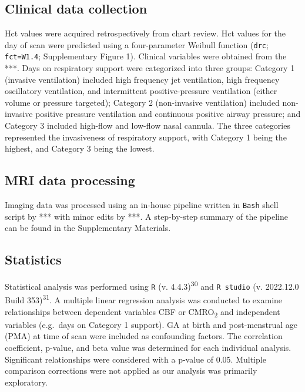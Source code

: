 \documentclass[
  letterpaper,
  DIV=11,
  numbers=noendperiod]{scrartcl}
\begin{document}
\subsection{Clinical data collection}\label{clinical-data-collection}

Hct values were acquired retrospectively from chart review. Hct values
for the day of scan were predicted using a four-parameter Weibull
function (\texttt{drc}; \texttt{fct=W1.4}; Supplementary Figure 1).
Clinical variables were obtained from the ***. Days on respiratory
support were categorized into three groups: Category 1 (invasive
ventilation) included high frequency jet ventilation, high frequency
oscillatory ventilation, and intermittent positive-pressure ventilation
(either volume or pressure targeted); Category 2 (non-invasive
ventilation) included non-invasive positive pressure ventilation and
continuous positive airway pressure; and Category 3 included high-flow
and low-flow nasal cannula. The three categories represented the
invasiveness of respiratory support, with Category 1 being the highest,
and Category 3 being the lowest.

\subsection{MRI data processing}\label{mri-data-processing}

Imaging data was processed using an in-house pipeline written in
\texttt{Bash} shell script by *** with minor edits by ***. A
step-by-step summary of the pipeline can be found in the Supplementary
Materials.

\subsection{Statistics}\label{statistics}

Statistical analysis was performed using \texttt{R} (v.
4.4.3)\textsuperscript{30} and \texttt{R\ studio} (v. 2022.12.0 Build
353)\textsuperscript{31}. A multiple linear regression analysis was
conducted to examine relationships between dependent variables CBF or
CMRO\textsubscript{2} and independent variables (e.g.~days on Category 1
support). GA at birth and post-menstrual age (PMA) at time of scan were
included as confounding factors. The correlation coefficient, p-value,
and beta value was determined for each individual analysis. Significant
relationships were considered with a p-value of 0.05. Multiple
comparison corrections were not applied as our analysis was primarily
exploratory.
\end{document}
